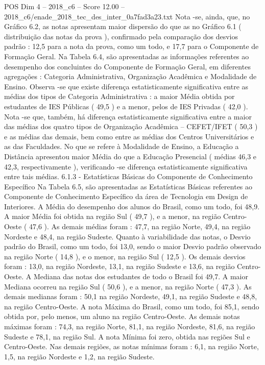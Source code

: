 \begin{textsample}{POS Dim 4 – 2018\_c6 – Score 12.00 – 2018\_c6/enade\_2018\_tec\_des\_inter\_0a7fad3a23.txt}
Nota -se, ainda, que, no Gráfico 6.2, as notas apresentam maior dispersão do que as no Gráfico 6.1 ( distribuição das notas da prova ), confirmado pela comparação dos desvios padrão : 12,5 para a nota da prova, como um todo, e 17,7 para o Componente de Formação Geral.
Na Tabela 6.4, são apresentadas as informações referentes ao desempenho dos concluintes do Componente de Formação Geral, em diferentes agregações : Categoria Administrativa, Organização Acadêmica e Modalidade de Ensino.
Observa -se que existe diferença estatisticamente significativa entre as médias dos tipos de Categoria Administrativa : a maior Média obtida por estudantes de IES Públicas ( 49,5 ) e a menor, pelos de IES Privadas ( 42,0 ).
Nota -se que, também, há diferença estatisticamente significativa entre a maior das médias dos quatro tipos de Organização Acadêmica – CEFET/IFET ( 50,3 ) e as médias das demais, bem como entre as médias dos Centros Universitários e as das Faculdades.
No que se refere à Modalidade de Ensino, a Educação a Distância apresentou maior Média do que a Educação Presencial ( médias 46,3 e 42,3, respectivamente ), verificando -se diferença estatisticamente significativa entre tais médias. 6.1.3 - Estatísticas Básicas do Componente de Conhecimento Específico Na Tabela 6.5, são apresentadas as Estatísticas Básicas referentes ao Componente de Conhecimento Específico da área de Tecnologia em Design de Interiores.
A Média do desempenho dos alunos do Brasil, como um todo, foi 48,9.
A maior Média foi obtida na região Sul ( 49,7 ), e a menor, na região Centro-Oeste ( 47,6 ).
As demais médias foram : 47,7, na região Norte, 49,4, na região Nordeste e 48,4, na região Sudeste.
Quanto à variabilidade das notas, o Desvio padrão do Brasil, como um todo, foi 13,0, sendo o maior Desvio padrão observado na região Norte ( 14,8 ), e o menor, na região Sul ( 12,5 ).
Os demais desvios foram : 13,0, na região Nordeste, 13,1, na região Sudeste e 13,6, na região Centro-Oeste.
A Mediana das notas dos estudantes de todo o Brasil foi 49,7.
A maior Mediana ocorreu na região Sul ( 50,6 ), e a menor, na região Norte ( 47,3 ).
As demais medianas foram : 50,1 na região Nordeste, 49,1, na região Sudeste e 48,8, na região Centro-Oeste.
A nota Máxima do Brasil, como um todo, foi 85,1, sendo obtida por, pelo menos, um aluno na região Centro-Oeste.
As demais notas máximas foram : 74,3, na região Norte, 81,1, na região Nordeste, 81,6, na região Sudeste e 78,1, na região Sul.
A nota Mínima foi zero, obtida nas regiões Sul e Centro-Oeste.
Nas demais regiões, as notas mínimas foram : 6,1, na região Norte, 1,5, na região Nordeste e 1,2, na região Sudeste.

\end{textsample}
